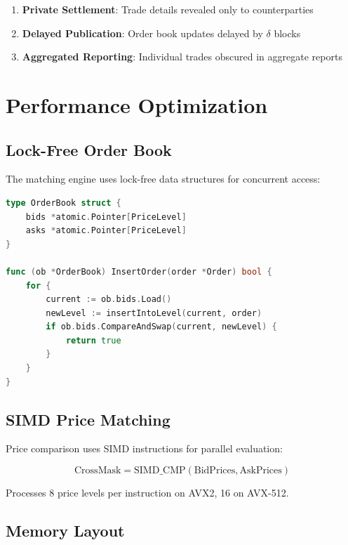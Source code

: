 \documentclass[11pt,a4paper]{article}
\begin{document}
\begin{enumerate}
    \item \textbf{Private Settlement}: Trade details revealed only to counterparties
    \item \textbf{Delayed Publication}: Order book updates delayed by $\delta$ blocks
    \item \textbf{Aggregated Reporting}: Individual trades obscured in aggregate reports
\end{enumerate}

\section{Performance Optimization}

\subsection{Lock-Free Order Book}

The matching engine uses lock-free data structures for concurrent access:

\begin{lstlisting}[language=Go, caption=Lock-free order book insertion]
type OrderBook struct {
    bids *atomic.Pointer[PriceLevel]
    asks *atomic.Pointer[PriceLevel]
}

func (ob *OrderBook) InsertOrder(order *Order) bool {
    for {
        current := ob.bids.Load()
        newLevel := insertIntoLevel(current, order)
        if ob.bids.CompareAndSwap(current, newLevel) {
            return true
        }
    }
}
\end{lstlisting}

\subsection{SIMD Price Matching}

Price comparison uses SIMD instructions for parallel evaluation:

\begin{equation}
    \text{CrossMask} = \text{SIMD\_CMP}(\text{BidPrices}, \text{AskPrices})
\end{equation}

Processes 8 price levels per instruction on AVX2, 16 on AVX-512.

\subsection{Memory Layout}
\end{document}
